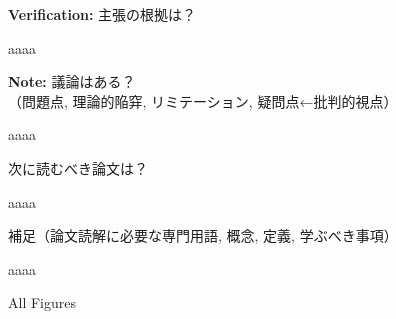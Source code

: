 \documentclass[a4j,11pt,twocolumn,dvipdfmx,platex]{jsarticle}
\begin{document}
\vspace{4mm}
\begin{screen}
	{\bf Verification:}
	主張の根拠は？
\end{screen}
%
aaaa


\vspace{4mm}
\begin{screen}
	{\bf Note:}
	議論はある？\\（問題点, 理論的陥穽, リミテーション, 疑問点←批判的視点）
\end{screen}
%
aaaa


\vspace{4mm}
\begin{screen}
	次に読むべき論文は？
\end{screen}
%
aaaa


\vspace{4mm}
\begin{screen}
	補足（論文読解に必要な専門用語, 概念, 定義, 学ぶべき事項）
\end{screen}
%
aaaa




\vspace{4mm}
\noindent
All Figures \hrulefill


%
%

\end{document}
